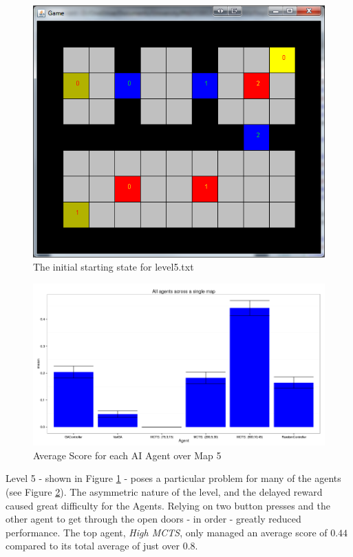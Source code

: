 \documentclass{IEEEtran}
\begin{document}
\pagebreak
\begin{figure}[!ht]
\centering
\includegraphics[scale=0.5]{level5}
\caption{The initial starting state for level5.txt}
\label{Level5State}
\end{figure}

\begin{figure}[!ht]
\centering
\includegraphics[width = \linewidth]{level5-txt-scores}
\caption{Average Score for each AI Agent over Map 5}
\label{avgScoreMap5}
\end{figure}

Level 5 - shown in Figure \ref{Level5State} - poses a particular problem for many of the agents (see Figure \ref{avgScoreMap5}). The asymmetric nature of the level, and the delayed reward caused great difficulty for the Agents. Relying on two button presses and the other agent to get through the open doors - in order - greatly reduced performance. The top agent, \emph{High MCTS}, only managed an average score of $0.44$ compared to its total average of just over $0.8$.
\end{document}
